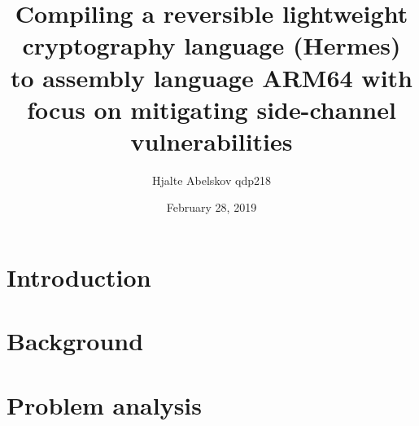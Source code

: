 \documentclass[a4paper,10pt,openright]{memoir}
\title{Compiling a reversible lightweight cryptography language (Hermes) to assembly language ARM64 with focus on mitigating side-channel vulnerabilities}
\author{Hjalte Abelskov qdp218}
\date{February 28, 2019} %
\begin{document}
\maketitle
{}
\setcounter{page}{3}

\cleardoublepage
\pagestyle{plain}
\begin{abstract}

\end{abstract}

\clearpage
\begin{resume}

\end{resume}

\setcounter{tocdepth}{2} %
\cleardoublepage
{}
\tableofcontents*

\cleardoublepage
{}
\setcounter{page}{1}

\chapter{Introduction}




\chapter{Background}
\label{chapt - Reversible-computing}


\label{chapt - Side-channel}






\chapter{Problem analysis}

\end{document}
